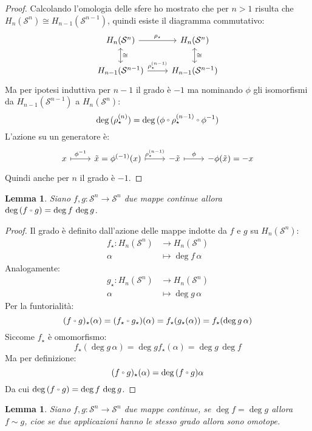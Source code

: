 \documentclass[10pt, toc=sectionentrywithdots]{scrartcl}
\newcounter{lemmac}
\newtheorem{lemma}[lemmac]{Lemma}
\newcommand{\Sph}[1][]{\mathcal{S}^#1}
\let\latexcirc=\circ
\newcommand{\ccirc}{\mathbin{\mathchoice
  {\xcirc\scriptstyle}
  {\xcirc\scriptstyle}
  {\xcirc\scriptscriptstyle}
  {\xcirc\scriptscriptstyle}
}}
\newcommand{\xcirc}[1]{\vcenter{\hbox{$#1\latexcirc$}}}
\let\circ\ccirc
\begin{document}
\begin{proof}
  Calcolando l'omologia delle sfere ho mostrato che per $ n > 1 $ risulta che $ H_n(\Sph{n}) \cong H_{n-1}(\Sph{n-1}) $,
  quindi esiste il diagramma commutativo:
  \[
    \begin{tikzcd}
      H_n(\Sph{n}) \rar{\rho_\star} \arrow[leftrightarrow]{d}{\cong} & H_n(\Sph{n})  \arrow[leftrightarrow]{d}{\cong} \\
      H_{n-1}(\Sph{n-1}) \rar{\rho_\star^{(n-1)}} &  H_{n-1}(\Sph{n-1})
    \end{tikzcd}
  \]
  Ma per ipotesi induttiva per $ n - 1 $ il grado è $ - 1 $ ma nominando
  $ \phi $ gli isomorfismi da $ H_{n-1}(\Sph{n-1}) $ a $ H_n(\Sph{n}) $:
  \[
    \deg{(\rho_\star^{(n)})} = \deg{(\phi \circ \rho_\star^{(n-1)} \circ \phi^{-1})}
  \]
  L'azione su un generatore è:
  \[
    \begin{tikzcd}
      x \rar[mapsto]{\phi^{-1}} & \tilde{x} = \phi^{(-1)}(x) \rar[mapsto]{\rho_\star^{(n-1)}} & - \tilde{x} \rar[mapsto]{\phi} & - \phi(\tilde{x}) = -x
    \end{tikzcd}
  \]
  Quindi anche per $ n $ il grado è $ - 1 $.
\end{proof}
\begin{lemma}
  \label{lemma:composizione_grado}
  Siano $ f,g \colon \Sph{n} \to \Sph{n} $ due mappe continue allora
  $ \deg {(f \circ g)} = \deg{f} \, \deg{g} $.
\end{lemma}
\begin{proof}
  Il grado è definito dall'azione delle mappe indotte da $ f $ e $ g $
  su $ H_n(\Sph{n}) $:
  \begin{align*}
    f_\star \colon H_n(\Sph{n}) & \to H_n(\Sph{n}) \\
    \alpha & \mapsto \deg f \, \alpha
  \end{align*}
  Analogamente:
  \begin{align*}
    g_\star \colon H_n(\Sph{n}) & \to H_n(\Sph{n}) \\
    \alpha & \mapsto \deg g \, \alpha
  \end{align*}
  Per la funtorialità:
  \[
    (f \circ g)_\star (\alpha) = (f_\star \circ g_\star)(\alpha) = f_\star(g_\star(\alpha)) = f_\star (\deg g \, \alpha)
  \]
  Siccome $ f_\star $ è omomorfismo:
  \[
    f_\star (\deg g \, \alpha) = \deg g f_\star (\alpha) = \deg g \, \deg f
  \]
  Ma per definizione:
  \[
    (f \circ g)_\star (\alpha) = \deg{(f \circ g)} \alpha
  \]
  Da cui $ \deg{(f \circ g)} = \deg f \, \deg g $.
\end{proof}
\begin{lemma}
  \label{lemma:hopf}
  Siano $ f,g \colon \Sph{n} \to \Sph{n} $ due mappe continue, se
  $ \deg f = \deg g $ allora $ f \sim g $, cioe se due applicazioni
  hanno le stesso grado allora sono omotope.
\end{lemma}
\end{document}
